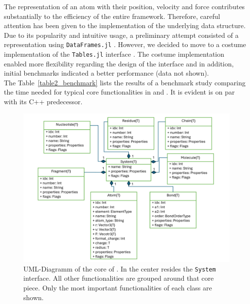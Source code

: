 The representation of an atom with their position, velocity and force contributes substantially to the efficiency of the entire framework. Therefore, careful attention has been given to the implementation of the underlying data structure. Due to its popularity and intuitive usage, a preliminary attempt consisted of a representation using \texttt{DataFrames.jl} \cite{Bouchet-Valat2023}. However, we decided to move to a costume implementation of the \texttt{Tables.jl} interface \cite{BouchetValat2018}. The costume implementation enabled more flexibility regarding the design of the interface and in addition, initial benchmarks indicated a better performance (data not shown). \\
The Table~\ref{table2_benchmark} lists the results of a benchmark study comparing the time needed for typical core functionalities in \ball and \biochem. It is evident \biochem is on par with its C++ predecessor.
\begin{figure}[t]
	\centerline{\includegraphics[width=15cm]{gfx/uml.png}}
	\caption{UML-Diagramm of the core of \biochem . In the center resides the \texttt{System} interface. All other functionalities are grouped around that core piece. Only the most important functionalities of each class are  shown.}
	\label{fig:biochem_uml}
\end{figure}

\begin{table}
\label{table2_benchmark}
\end{table}
